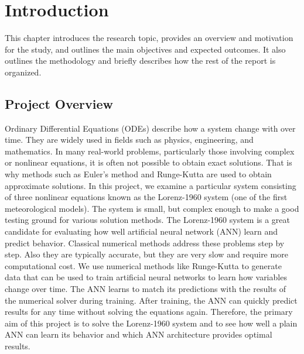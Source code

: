 \chapter{Introduction}

This chapter introduces the research topic, provides an overview and motivation for the study, and outlines the main objectives and expected outcomes. It also outlines the methodology and briefly describes how the rest of the report is organized.

\section{Project Overview}
Ordinary Differential Equations (ODEs) describe how a system change with over time. They are widely used in fields such as physics, engineering, and mathematics. In many 
real-world problems, particularly those involving complex or nonlinear equations, it is often 
not possible to obtain exact solutions. That is why methods such as Euler’s method and 
Runge-Kutta are used to obtain approximate solutions. In this project, we examine a 
particular system consisting of three nonlinear equations known as the Lorenz-1960 system 
(one of the first meteorological models). The system is small, but complex enough to 
make a good testing ground for various solution methods. The Lorenz-1960 system is a 
great candidate for evaluating how well  artificial neural network (ANN) learn and predict behavior. Classical 
numerical methods address these problems step by step. Also they are typically accurate, but 
they are very slow and require more computational cost. We use numerical methods like Runge-Kutta to generate data that can be used to train artificial neural networks to learn how variables change over time.
The ANN learns to match its predictions with the results of the numerical solver during training. After training, the ANN can quickly predict results for any time without solving the equations again.
Therefore, the primary aim  of this project is to solve the Lorenz-1960 system 
and to see how well a plain ANN can learn its behavior and which ANN architecture provides
optimal results. 


